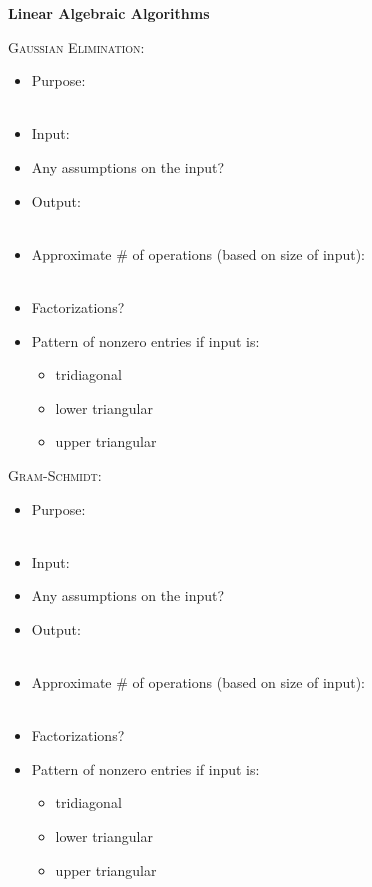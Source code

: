 \documentclass[11pt]{article}
\begin{document}
\pagebreak

\begin{center}
\textbf{Linear Algebraic Algorithms}
\end{center}

\noindent \textsc{Gaussian Elimination:}
\begin{itemize}
\item Purpose: \\ \\
\item Input: \\ 
\item Any assumptions on the input? \\
\item Output: \\ \\
\item Approximate \# of operations (based on size of input): \\ \\
\item Factorizations? \\
\item Pattern of nonzero entries if input is:
\begin{itemize}
\item tridiagonal
\item lower triangular
\item upper triangular
\end{itemize}
\end{itemize}

\noindent \textsc{Gram-Schmidt:}
\begin{itemize}
\item Purpose: \\ \\
\item Input: \\ 
\item Any assumptions on the input? \\
\item Output: \\ \\
\item Approximate \# of operations (based on size of input): \\ \\
\item Factorizations? \\
\item Pattern of nonzero entries if input is:
\begin{itemize}
\item tridiagonal
\item lower triangular
\item upper triangular
\end{itemize}
\end{itemize}
\end{document}
